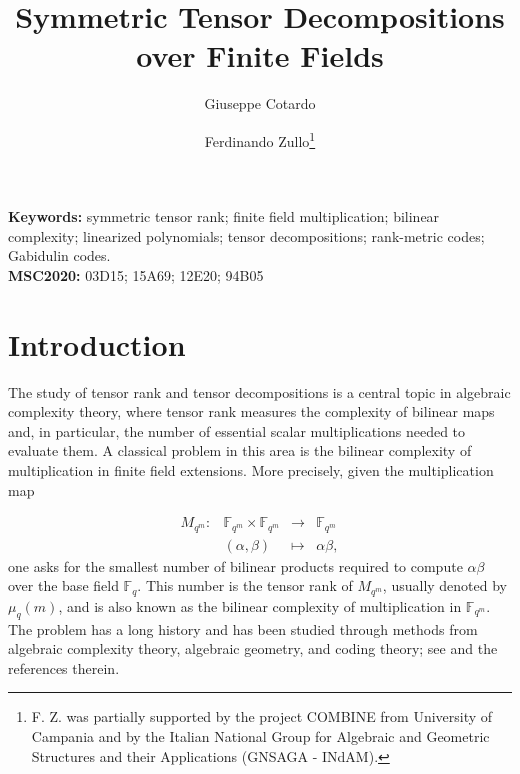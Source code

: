 \documentclass[11pt,a4paper,reqno]{article}
\title{\textbf{Symmetric Tensor Decompositions over Finite Fields}}
\author[1]{Giuseppe Cotardo}
\affil[1]{Virginia Tech, Blacksburg, U.S.A.}
\author[2]{Ferdinando Zullo\thanks{F. Z. was partially supported by the project COMBINE from University of Campania and by the Italian National Group for Algebraic and Geometric Structures and their Applications (GNSAGA - INdAM).}}
\affil[2]{Universit\`a degli Studi della Campania ``Luigi Vanvitelli'', Caserta, Italy.}
\date{}
\numberwithin{equation}{section}
\theoremstyle{definition}
\renewcommand{\longrightarrow}{\to}
\begin{document}
\maketitle
	

\medskip

\textbf{Keywords:}{ symmetric tensor rank; finite field multiplication; bilinear complexity; linearized polynomials; tensor decompositions; rank-metric codes; Gabidulin codes.}\\

\textbf{MSC2020:}{ 03D15; 15A69; 12E20; 94B05}


\section*{Introduction}

The study of tensor rank and tensor decompositions is a central topic in
algebraic complexity theory, where tensor rank measures the complexity of
bilinear maps and, in particular, the number of essential scalar
multiplications needed to evaluate them. A classical problem in this area is
the bilinear complexity of multiplication in finite field extensions. More
precisely, given the multiplication map

\[
\begin{array}{cccc}
M_{q^m}:&\mathbb F_{q^m}\times \mathbb F_{q^m}&
\longrightarrow &\mathbb F_{q^m}\\&(\alpha,\beta)&\longmapsto &\alpha\beta,
\end{array}
\]
one asks for the smallest number of bilinear products required to compute
\(\alpha\beta\) over the base field \(\mathbb F_q\). This number is the
tensor rank of \(M_{q^m}\), usually denoted by \(\mu_q(m)\), and is also
known as the bilinear complexity of multiplication in \(\mathbb F_{q^m}\).
The problem has a long history and has been studied through methods from
algebraic complexity theory, algebraic geometry, and coding theory; see
\cite{ballet2021tensor,burgisser2013algebraic} and the references therein.
\end{document}
